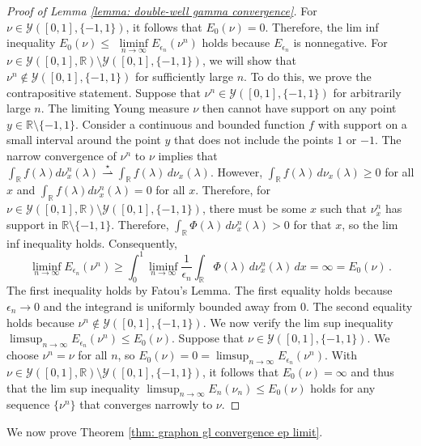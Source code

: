 \documentclass[11pt]{amsart}
\def\R{\mathbb{R}}
\def\ep{\epsilon}
\def\calY{\mathcal{Y}}
\def\ra{\rightarrow}
\def\weakstarra{\stackrel{\star}{\rightharpoonup}}
\numberwithin{equation}{section}
\begin{document}
{\begin{proof}[Proof of Lemma \ref{lemma: double-well gamma convergence}]
        
    {For} $\nu \in \mathcal{Y}([0,1],\{-1,1\})$, it follows that $E_0(\nu) = 0$. {Therefore, the lim inf} inequality $E_0(\nu) \leq$ $\liminf\limits_{n\ra\infty} E_{\ep_n}(\nu^n)$ 
    holds because {$E_{\ep_n}$} is nonnegative. {For} $\nu \in \mathcal{Y}([0,1],\R) \setminus \mathcal{Y}([0,1],\{-1,1\})$, we will show that $\nu^n \not\in \mathcal{Y}([0,1],\{-1,1\})$ for sufficiently large $n$. 
    {{To do this, we prove the contrapositive statement.} Suppose that $\nu^n \in \calY([0,1], \{-1,1\})$ for arbitrarily large $n$. The limiting Young measure $\nu$ then cannot have support on any point $y \in \R \setminus \{-1,1\}$. Consider a continuous and bounded function $f$ with support on a small interval around {the point} $y$ that does not include the points $1$ or $-1$.
    The narrow convergence of $\nu^n$ to $\nu$ implies that $\int_\R f(\lambda) d\nu^n_x(\lambda) \weakstarra \int_\R f(\lambda) \,d\nu_x(\lambda)$. However,
    $\int_\R f(\lambda) \,d\nu_x(\lambda) \geq 0$ for all $x$ and $\int_\R f(\lambda) d\nu^n_x(\lambda) = 0$ for all $x$. }
    Therefore, {for} $\nu \in \mathcal{Y}([0,1],\R) \setminus \mathcal{Y}([0,1],\{-1,1\})$, there must be some $x$ such that $\nu^n_x$ has support in $\R \setminus \{-1,1\}${. Therefore,} $\int_\R \Phi(\lambda)\,d\nu^n_x(\lambda) > 0$ for that $x${, so
    the lim inf inequality holds. Consequently,} 
    \begin{equation}
        \liminf_{n\ra\infty} E_{\ep_n}(\nu^n)\geq  {\int_0^1} \liminf_{n\ra\infty} \frac{1}{\ep_n}   \int_\R \Phi(\lambda)\,d\nu^n_x(\lambda) \, dx = \infty = E_0(\nu) \,. 
    \end{equation}   
The first inequality holds {by} Fatou's {Lemma}. The first equality holds because $\ep_n \ra 0$ and the integrand is uniformly bounded away from {$0$}. The second equality holds because $\nu^n \not\in \mathcal{Y}([0,1],\{-1,1\})$. We now verify the {lim sup} inequality $\limsup_{n\ra\infty} E_{\ep_n}(\nu^n) \leq E_0(\nu)$. Suppose that $\nu \in \mathcal{Y}([0,1],\{-1,1\})$. We choose $\nu^n = \nu$ for all $n$, so $E_0(\nu) = 0 = \limsup_{n\ra \infty} E_{\ep_n}(\nu^n)$. {With} $\nu \in \mathcal{Y}([0,1],\R)\setminus \mathcal{Y}([0,1],\{-1,1\})$, {it follows that} $E_0(\nu) = \infty$ and thus that the {lim sup} inequality $\limsup_{n\ra\infty} E_n (\nu_n) \leq E_0(\nu)$ holds for any sequence {$\{\nu^n\}$} that converges narrowly to $\nu$. 
\end{proof}


We now prove Theorem \ref{thm: graphon gl convergence ep limit}.

}
\end{document}
